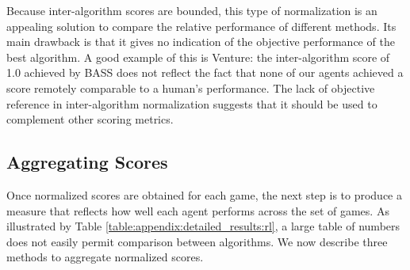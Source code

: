 \documentclass[twoside,11pt]{article}
\newcommand{\gamename}[1]{{\sc #1}}
\begin{document}
Because inter-algorithm scores are bounded, this type of normalization is an appealing solution to compare the relative performance of different methods.
Its main drawback is that it gives no indication of the objective performance of the best algorithm. 
A good example of this is \gamename{Venture}: the inter-algorithm score of 1.0 achieved by BASS does not reflect the fact that none of our agents achieved a score remotely comparable to a human's performance. The lack of objective reference in inter-algorithm normalization suggests that it should be used to complement other scoring metrics. 

\subsection{Aggregating Scores}

Once normalized scores are obtained for each game, the next step is to produce a measure that reflects how well each agent performs across the set of games. As illustrated by Table \ref{table:appendix:detailed_results:rl}, a large table of numbers does not easily permit comparison between algorithms. We now describe three methods to aggregate normalized scores.
\end{document}
